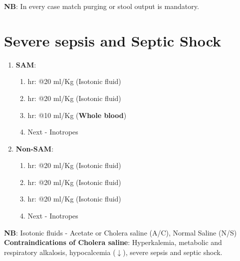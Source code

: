 \documentclass[11pt,a4paper]{report}
\begin{document}
\noindent
\textbf{NB}: In every case match purging or stool output is mandatory.\\

\section{Severe sepsis and Septic Shock}
\begin{enumerate}
	\item \textbf{SAM}:
	\begin{enumerate}
		\item {} hr: @20 ml/Kg (Isotonic fluid)
		\item {} hr: @20 ml/Kg (Isotonic fluid)
		\item {} hr: @10 ml/Kg (\textbf{Whole blood})
		\item Next - Inotropes
	\end{enumerate}
	\item \textbf{Non-SAM}:
	\begin{enumerate}
		\item {} hr: @20 ml/Kg (Isotonic fluid)
		\item {} hr: @20 ml/Kg (Isotonic fluid)
		\item {} hr: @20 ml/Kg (Isotonic fluid)
		\item Next - Inotropes\\
	\end{enumerate}
\end{enumerate}

\noindent
\textbf{NB}: Isotonic fluids - Acetate or Cholera saline (A/C), Normal Saline (N/S) \\

\noindent \textbf{Contraindications of Cholera saline}: Hyperkalemia, metabolic and respiratory alkalosis, hypocalcemia ($\downarrow$), severe sepsis and septic shock.

~\\
\end{document}

